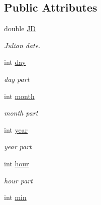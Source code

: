 \subsection*{Public Attributes}
\begin{DoxyCompactItemize}
\item 
\hypertarget{classamzer_a89ef2e4431b265699e5fc492a20040e4}{double \hyperlink{classamzer_a89ef2e4431b265699e5fc492a20040e4}{J\-D}}\label{classamzer_a89ef2e4431b265699e5fc492a20040e4}

\begin{DoxyCompactList}\small\item\em Julian date. \end{DoxyCompactList}\item 
\hypertarget{classamzer_aac3c9decc5d31db195c0d57ab61b28b1}{int \hyperlink{classamzer_aac3c9decc5d31db195c0d57ab61b28b1}{day}}\label{classamzer_aac3c9decc5d31db195c0d57ab61b28b1}

\begin{DoxyCompactList}\small\item\em day part \end{DoxyCompactList}\item 
\hypertarget{classamzer_af389231e2040cc77fa46a0ba3a290a86}{int \hyperlink{classamzer_af389231e2040cc77fa46a0ba3a290a86}{month}}\label{classamzer_af389231e2040cc77fa46a0ba3a290a86}

\begin{DoxyCompactList}\small\item\em month part \end{DoxyCompactList}\item 
\hypertarget{classamzer_ab41100919229e63daf7aa026dbac0008}{int \hyperlink{classamzer_ab41100919229e63daf7aa026dbac0008}{year}}\label{classamzer_ab41100919229e63daf7aa026dbac0008}

\begin{DoxyCompactList}\small\item\em year part \end{DoxyCompactList}\item 
\hypertarget{classamzer_a1c082f5edd1446f7c8f4e0fdb4c728ca}{int \hyperlink{classamzer_a1c082f5edd1446f7c8f4e0fdb4c728ca}{hour}}\label{classamzer_a1c082f5edd1446f7c8f4e0fdb4c728ca}

\begin{DoxyCompactList}\small\item\em hour part \end{DoxyCompactList}\item 
\hypertarget{classamzer_aab2447c03345ad30e56cafe230cf1756}{int \hyperlink{classamzer_aab2447c03345ad30e56cafe230cf1756}{min}}\label{classamzer_aab2447c03345ad30e56cafe230cf1756}


\end{DoxyCompactItemize}

